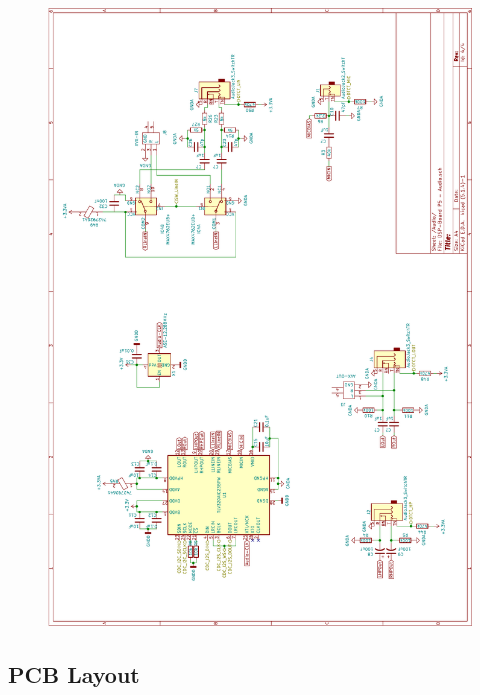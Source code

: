 \begin{appendix}
\begin{figure}[h]
	\centering
	\includegraphics[width=0.95\linewidth]{appendix/DSP-Board Schema V1-1 (4).pdf}
\end{figure}

\clearpage

\subsection{PCB Layout}
\label{app:PCB}


\end{appendix}
